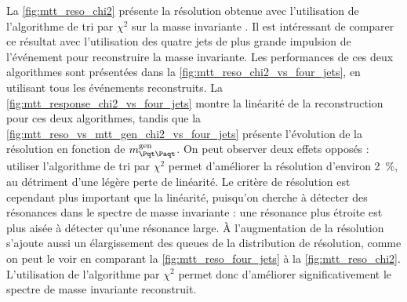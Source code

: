 \bigskip

La \cref{fig:mtt_reso_chi2} présente la résolution obtenue avec l'utilisation de l'algorithme de tri par $\chi^2$ sur la masse invariante \mtt. Il est intéressant de comparer ce résultat avec l'utilisation des quatre jets de plus grande impulsion de l'événement pour reconstruire la masse invariante. Les performances de ces deux algorithmes sont présentées dans la \cref{fig:mtt_reso_chi2_vs_four_jets}, en utilisant tous les événements reconstruits. La \cref{fig:mtt_response_chi2_vs_four_jets} montre la linéarité de la reconstruction pour ces deux algorithmes, tandis que la \cref{fig:mtt_reso_vs_mtt_gen_chi2_vs_four_jets} présente l'évolution de la résolution en fonction de $\mtt^\text{gen}$. On peut observer deux effets opposés : utiliser l'algorithme de tri par $\chi^2$ permet d'améliorer la résolution d'environ \SI{2}{\%}, au détriment d'une légère perte de linéarité. Le critère de résolution est cependant plus important que la linéarité, puisqu'on cherche à détecter des résonances dans le spectre de masse invariante : une résonance plus étroite est plus aisée à détecter qu'une résonance large. À l'augmentation de la résolution s'ajoute aussi un élargissement des queues de la distribution de résolution, comme on peut le voir en comparant la \cref{fig:mtt_reso_four_jets} à la \cref{fig:mtt_reso_chi2}. L'utilisation de l'algorithme par $\chi^2$ permet donc d'améliorer significativement le spectre de masse invariante reconstruit.

